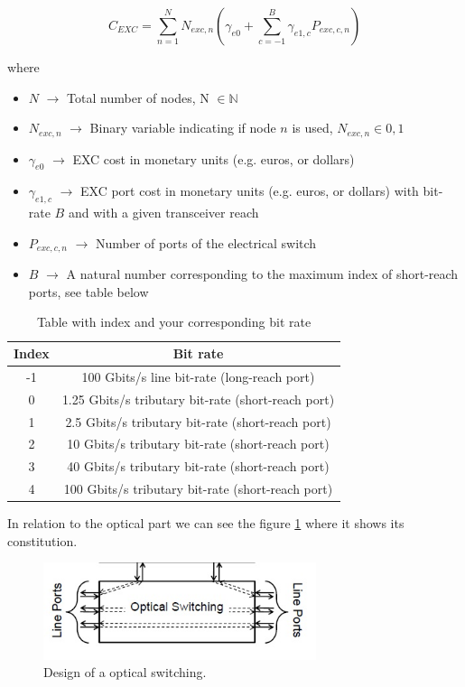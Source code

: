 \begin{equation}
C_{EXC} = \sum_{n=1}^{N} N_{exc,n} \left( \gamma_{e0} + \sum_{c=-1}^B \gamma_{e1,c} P_{exc,c,n} \right)
\label{Capex_Node_EXC}
\end{equation}

where
\begin{itemize}
\item{$N$				$\rightarrow$	Total number of nodes, N $\in \mathbb{N}$}
\item{$N_{exc,n}$		$\rightarrow$	Binary variable indicating if node $n$ is used, $N_{exc,n} \in {0, 1}$}
\item{$\gamma_{e0}$ 	$\rightarrow$	EXC cost in monetary units (e.g. euros, or dollars)}
\item{$\gamma_{e1,c}$	$\rightarrow$	EXC port cost in monetary units (e.g. euros, or dollars) with bit-rate $B$ and with a given transceiver reach}
\item{$P_{exc,c,n}$	    $\rightarrow$	Number of ports of the electrical switch}
\item{$B$           	$\rightarrow$	A natural number corresponding to the maximum index of short-reach ports, see table below}
\end{itemize}

\begin{table}[h!]
\centering
\begin{tabular}{|c|c|}
  \hline
  Index & Bit rate \\
 \hline\hline
  -1 & 100 Gbits/s line bit-rate (long-reach port) \\
  0 & 1.25 Gbits/s tributary bit-rate (short-reach port) \\
  1 & 2.5 Gbits/s tributary bit-rate (short-reach port) \\
  2 & 10 Gbits/s tributary bit-rate (short-reach port) \\
  3 & 40 Gbits/s tributary bit-rate (short-reach port) \\
  4 & 100 Gbits/s tributary bit-rate (short-reach port) \\
  \hline
\end{tabular}
\caption{Table with index and your corresponding bit rate}
\label{table_bitrate}
\end{table}

\newpage
In relation to the optical part we can see the figure \ref{oxc_design} where it shows its constitution.\\

\begin{figure}[h!]
\centering
\includegraphics[width=8cm]{sdf/ILP/figures/oxc_design}
\caption{Design of a optical switching.}
\label{oxc_design}
\end{figure}


